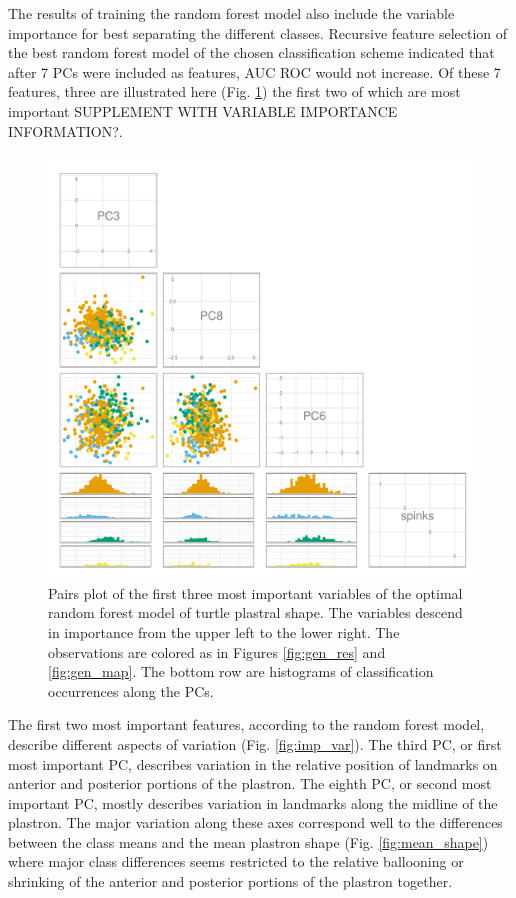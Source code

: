 \documentclass[12pt]{article}\usepackage{graphicx, color}
\begin{document}
The results of training the random forest model also include the variable importance for best separating the different classes. Recursive feature selection of the best random forest model of the chosen classification scheme indicated that after 7 PCs were included as features, AUC ROC would not increase. Of these 7 features, three are illustrated here (Fig. \ref{fig:imp_pc}) the first two of which are most important SUPPLEMENT WITH VARIABLE IMPORTANCE INFORMATION?. 

\begin{figure}[ht]
  \centering
  \includegraphics[width = \textwidth]{figure/pca_imp}
  \caption{Pairs plot of the first three most important variables of the optimal random forest model of turtle plastral shape. The variables descend in importance from the upper left to the lower right. The observations are colored as in Figures \ref{fig:gen_res} and \ref{fig:gen_map}.  The bottom row are histograms of classification occurrences along the PCs.}
  \label{fig:imp_pc}
\end{figure}

The first two most important features, according to the random forest model, describe different aspects of variation (Fig. \ref{fig:imp_var}). The third PC, or first most important PC, describes variation in the relative position of landmarks on anterior and posterior portions of the plastron. The eighth PC, or second most important PC, mostly describes variation in landmarks along the midline of the plastron. The major variation along these axes correspond well to the differences between the class means and the mean plastron shape (Fig. \ref{fig:mean_shape}) where major class differences seems restricted to the relative ballooning or shrinking of the anterior and posterior portions of the plastron together.
\end{document}
